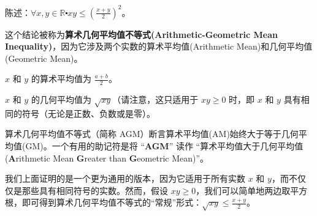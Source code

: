 \begin{center}
\noindent {}
\end{center}

\begin{example}[算术几何平均值不等式的一个实例]

    \begin{center}
        陈述：$\forall x, y \in \mathbb{R} \centerdot xy \le (\frac{x+y}{2})^2$。
    \end{center}
    \begin{center}
        \noindent {}
    \end{center}
    这个结论被称为\textbf{算术几何平均值不等式(Arithmetic-Geometric Mean Inequality)}，因为它涉及两个实数的算术平均值(Arithmetic Mean)和几何平均值(Geometric Mean)。

    $x$ 和 $y$ 的算术平均值为 $\frac{a+b}{2}$。

    $x$ 和 $y$ 的几何平均值为 $\sqrt{xy}$（请注意，这只适用于 $xy \ge 0$ 时，即 $x$ 和 $y$ 具有相同的符号（无论是正数、负数或是零）。

    算术几何平均值不等式（简称 AGM）断言算术平均值(AM)始终大于等于几何平均值(GM)。一个有用的助记符是将 ``\textbf{AGM}'' 读作 ``算术平均值大于几何平均值(\textbf{A}rithmetic Mean \textbf{G}reater than \textbf{G}eometric Mean)''。

    我们上面证明的是一个更为通用的版本，因为它适用于所有实数 $x$ 和 $y$，而不仅仅是那些具有相同符号的实数。然而，假设 $xy \ge 0$，我们可以简单地两边取平方根，即可得到算术几何平均值不等式的``常规''形式：$\sqrt{xy} \le \frac{x+y}{2}$。
\end{example}

